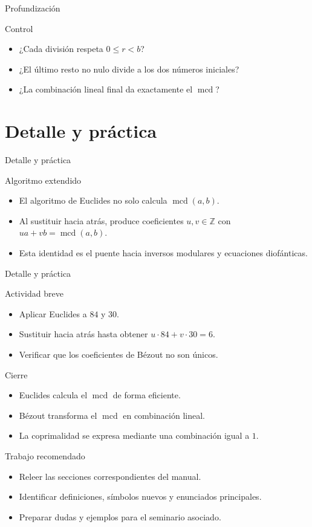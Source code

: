 \documentclass[aspectratio=169,11pt]{beamer}
\newcommand{\mcd}{\operatorname{mcd}}
\begin{document}
\begin{frame}{Profundización}
\begin{block}{Control}
\begin{itemize}
  \item ¿Cada división respeta \(0\leq r<b\)?
  \item ¿El último resto no nulo divide a los dos números iniciales?
  \item ¿La combinación lineal final da exactamente el \(\mcd\)?
\end{itemize}
\end{block}
\end{frame}


\section{Detalle y práctica}

\begin{frame}{Detalle y práctica}
\begin{block}{Algoritmo extendido}
\begin{itemize}
  \item El algoritmo de Euclides no solo calcula \(\mcd(a,b)\).
  \item Al sustituir hacia atrás, produce coeficientes \(u,v\in\mathbb{Z}\) con \(ua+vb=\mcd(a,b)\).
  \item Esta identidad es el puente hacia inversos modulares y ecuaciones diofánticas.
\end{itemize}
\end{block}
\end{frame}

\begin{frame}{Detalle y práctica}
\begin{block}{Actividad breve}
\begin{itemize}
  \item Aplicar Euclides a \(84\) y \(30\).
  \item Sustituir hacia atrás hasta obtener \(u\cdot 84+v\cdot 30=6\).
  \item Verificar que los coeficientes de Bézout no son únicos.
\end{itemize}
\end{block}
\end{frame}

\begin{frame}{Cierre}
\begin{itemize}
  \item Euclides calcula el \(\mcd\) de forma eficiente.
  \item Bézout transforma el \(\mcd\) en combinación lineal.
  \item La coprimalidad se expresa mediante una combinación igual a \(1\).
\end{itemize}
\end{frame}

\begin{frame}{Trabajo recomendado}
\begin{itemize}
  \item Releer las secciones correspondientes del manual.
  \item Identificar definiciones, símbolos nuevos y enunciados principales.
  \item Preparar dudas y ejemplos para el seminario asociado.
\end{itemize}
\end{frame}
\end{document}
